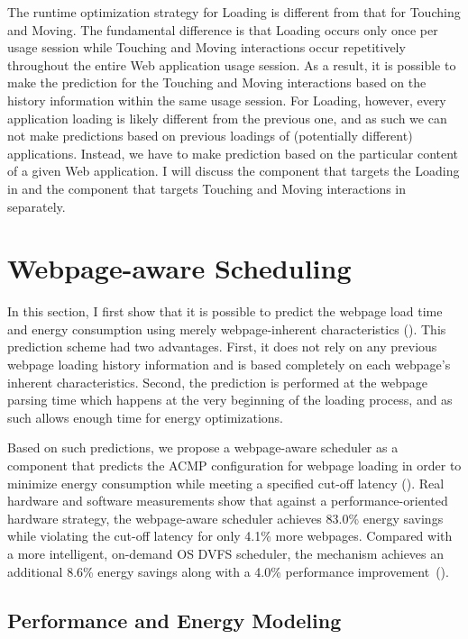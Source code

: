 The runtime optimization strategy for Loading is different from that for Touching and Moving. The fundamental difference is that Loading occurs only once per usage session while Touching and Moving interactions occur repetitively throughout the entire Web application usage session. As a result, it is possible to make the prediction for the Touching and Moving interactions based on the history information within the same usage session. For Loading, however, every application loading is likely different from the previous one, and as such we can not make predictions based on previous loadings of (potentially different) applications. Instead, we have to make prediction based on the particular content of a given Web application. I will discuss the \webrt component that targets the Loading in  and the component that targets Touching and Moving interactions in  separately.

\section{Webpage-aware Scheduling}
\label{sec:runtime:load}

In this section, I first show that it is possible to predict the webpage load time and energy consumption using merely webpage-inherent characteristics (). This prediction scheme had two advantages. First, it does not rely on any previous webpage loading history information and is based completely on each webpage's inherent characteristics. Second, the prediction is performed at the webpage parsing time which happens at the very beginning of the loading process, and as such allows enough time for energy optimizations.

Based on such predictions, we propose a webpage-aware scheduler as a \webrt component that predicts the ACMP configuration for webpage loading in order to minimize energy consumption while meeting a specified cut-off latency (). Real hardware and software measurements show that against a performance-oriented hardware strategy, the webpage-aware scheduler achieves 83.0\% energy savings while violating the cut-off latency for only 4.1\% more webpages. Compared with a more intelligent, on-demand OS DVFS scheduler, the mechanism achieves an additional 8.6\% energy savings along with a 4.0\% performance improvement~().

\subsection{Performance and Energy Modeling}
\label{sec:runtime:load:model}


